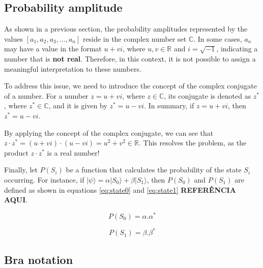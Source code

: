 		\subsection{Probability amplitude}
			\label{sec:probAmpli}
			\par As shown in a previous section, the probability amplitudes represented by the values $[a_1,a_2,a_3, \dots, a_n]$ reside in the complex number set $\mathbb{C}$. In some cases, $a_n$ may have a value in the format $u + vi$, where $u, v \in \mathbb{R}$ and $i = \sqrt{-1}$, indicating a number that is \textbf{not real}. Therefore, in this context, it is not possible to assign a meaningful interpretation to these numbers.\newline
			
			\par To address this issue, we need to introduce the concept of the complex conjugate of a number. For a number $z = u + vi$, where $z \in \mathbb{C}$, its conjugate is denoted as $z^*$, where $z^* \in \mathbb{C}$, and it is given by $z^* = u - vi$. In summary, if $z = u + vi$, then $z^* = u - vi$. \newline
			
			\par By applying the concept of the complex conjugate, we can see that $z \cdot z^* = (u + vi) \cdot (u - vi) = u^2 + v^2 \in \mathbb{R}$. This resolves the problem, as the product $z \cdot z^*$ is a real number!\newline
			
			\par Finally, let \(P(S_i)\) be a function that calculates the probability of the state \(S_i\) occurring. For instance, if \(|\psi\rangle = \alpha |S_0\rangle + \beta |S_1\rangle\), then \(P(S_0)\) and \(P(S_1)\) are defined as shown in equations \ref{eq:state0} and \ref{eq:state1} \textbf{REFERÊNCIA AQUI}.
			
			\begin{equation}
				\label{eq:state0}
				P(S_0) = \alpha . \alpha^* 
			\end{equation} 
			
			\begin{equation}
				\label{eq:state1}
				P(S_1) = \beta . \beta^* 
			\end{equation}

		\subsection{Bra notation}
			\label{sec:braNotation}
		
